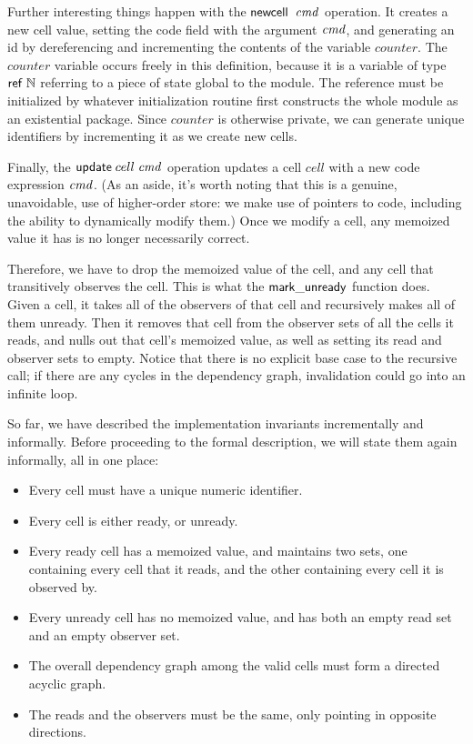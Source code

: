 Further interesting things happen with the $\mathsf{newcell}\;\;\mathit{cmd}$ operation.
It creates a new cell value, setting the code field with the argument
$\mathit{cmd}$, and generating an id by dereferencing and incrementing the
contents of the variable $counter$. The $counter$ variable occurs
freely in this definition, because it is a variable of type
$\mathsf{ref}\;\mathbb{N}$ referring to a piece of state global to the module.
The reference must be initialized by whatever initialization routine
first constructs the whole module as an existential package.  Since
$counter$ is otherwise private, we can generate unique identifiers by
incrementing it as we create new cells.

Finally, the $\mathsf{update}\;cell\;\mathit{cmd}$ operation updates a cell
$cell$ with a new code expression $\mathit{cmd}$. (As an aside, it's worth
noting that this is a genuine, unavoidable, use of higher-order store:
we make use of pointers to code, including the ability to dynamically
modify them.) Once we modify a cell, any memoized value it has is no
longer necessarily correct.

Therefore, we have to drop the memoized value of the cell, and any
cell that transitively observes the cell. This is what the
$\mathsf{mark\_unready}$ function does. Given a cell, it takes all of
the observers of that cell and recursively makes all of them
unready. Then it removes that cell from the observer sets of all the
cells it reads, and nulls out that cell's memoized value, as well as
setting its read and observer sets to empty. Notice that there is no
explicit base case to the recursive call; if there are any cycles in
the dependency graph, invalidation could go into an infinite loop.

So far, we have described the implementation invariants incrementally
and informally. Before proceeding to the formal description, we will
state them again informally, all in one place:

\begin{itemize}
  \item Every cell must have a unique numeric identifier.
  \item Every cell is either ready, or unready. 
  \item Every ready cell has a memoized value, and maintains 
    two sets, one containing every cell that it reads, and the
    other containing every cell it is observed by. 
  \item Every unready cell has no memoized value, and has 
    both an empty read set and an empty observer set. 
  \item The overall dependency graph among the valid cells must form a
    directed acyclic graph. 
  \item The reads and the observers must be the same, only 
    pointing in opposite directions.
\end{itemize}

